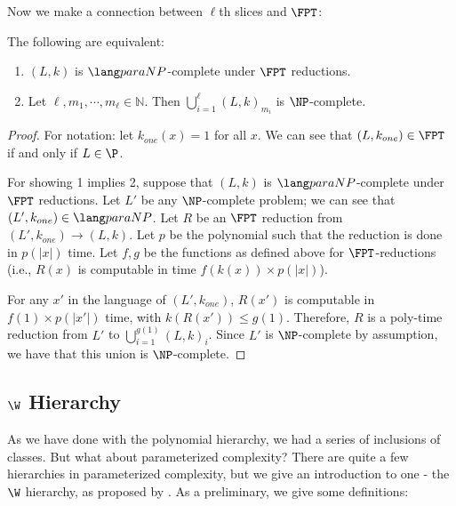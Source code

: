 Now we make a connection between $\ell$th slices and $\FPT$:
\begin{theorem}
The following are equivalent:
\begin{enumerate}
\item $(L, k)$ is $\paraNP$-complete under $\FPT$ reductions.
\item Let $\ell, m_1, \cdots, m_{\ell} \in \mathbb{N}$. Then $\bigcup_{i=1}^{\ell} (L, k)_{m_i}$ is $\NP$-complete.
\end{enumerate}
\end{theorem}
\begin{proof}
For notation: let $k_{one}(x) = 1$ for all $x$. We can see that $(L, k_{one}) \in \FPT$ if and only if $L \in \P$.

\par For showing 1 implies 2, suppose that $(L, k)$ is $\paraNP$-complete under $\FPT$ reductions. Let $L'$ be any $\NP$-complete problem; we can see that $(L', k_{one}) \in \paraNP$. Let $R$ be an $\FPT$ reduction from $(L', k_{one}) \rightarrow (L, k)$. Let $p$ be the polynomial such that the reduction is done in $p(|x|)$ time. Let $f, g$ be the functions as defined above for $\FPT$-reductions (i.e., $R(x)$ is computable in time $f(k(x))\times p(|x|)$).

\par For any $x'$ in the language of $(L', k_{one})$, $R(x')$ is computable in $f(1)\times p(|x'|)$ time, with $k(R(x')) \le g(1)$. Therefore, $R$ is a poly-time reduction from $L'$ to $\bigcup_{i=1}^{g(1)}(L, k)_{i}$. Since $L'$ is $\NP$-complete by assumption, we have that this union is $\NP$-complete.
\end{proof}



\subsection{$\W$ Hierarchy}
As we have done with the polynomial hierarchy, we had a series of inclusions of classes. But what about parameterized complexity? There are quite a few hierarchies in parameterized complexity, but we give an introduction to one - the $\W$ hierarchy, as proposed by \cite{Downey1995109}. As a preliminary, we give some definitions:

